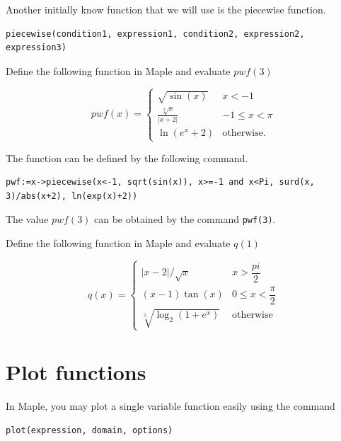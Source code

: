 \documentclass[]{book}
\theoremstyle{definition}
\theoremstyle{definition}
\theoremstyle{definition}
\theoremstyle{remark}
\let\BeginKnitrBlock\begin \let\EndKnitrBlock\end
\begin{document}
Another initially know function that we will use is the piecewise function.

\begin{verbatim}
piecewise(condition1, expression1, condition2, expression2, expression3)
\end{verbatim}

\BeginKnitrBlock{example}
\protect\hypertarget{exm:unnamed-chunk-5}{}{\label{exm:unnamed-chunk-5} }
Define the following function in Maple and evaluate \(pwf(3)\)

\[
pwf(x) =
  \begin{cases}
    \sqrt{\sin(x)} & x<-1\\
    \frac{\sqrt[3]{x}}{|x+2|} & -1\leq x<\pi\\
    \ln(e^x+2) & \text{otherwise}.
  \end{cases}
\]
\EndKnitrBlock{example}

\BeginKnitrBlock{solution}
{}
The function can be defined by the following command.

\begin{verbatim}
pwf:=x->piecewise(x<-1, sqrt(sin(x)), x>=-1 and x<Pi, surd(x, 3)/abs(x+2), ln(exp(x)+2))
\end{verbatim}

The value \(pwf(3)\) can be obtained by the command \texttt{pwf(3)}.
\EndKnitrBlock{solution}

\BeginKnitrBlock{exercise}
\protect\hypertarget{exr:piecewise-exer1}{}{\label{exr:piecewise-exer1} }
Define the following function in Maple and evaluate \(q(1)\)

\[
q(x) =
\begin{cases}
  |x-2|/\sqrt{x} & x>\dfrac{pi}{2}\\
  (x-1)\tan(x) & 0\leq x< \dfrac{\pi}{2}\\
  \sqrt[5]{\log_2(1+e^x)} & \text{otherwise}
\end{cases}
\]
\EndKnitrBlock{exercise}

\hypertarget{plot-functions}{%
\section{Plot functions}\label{plot-functions}}

In Maple, you may plot a single variable function easily using the command

\begin{verbatim}
plot(expression, domain, options)
\end{verbatim}
\end{document}
